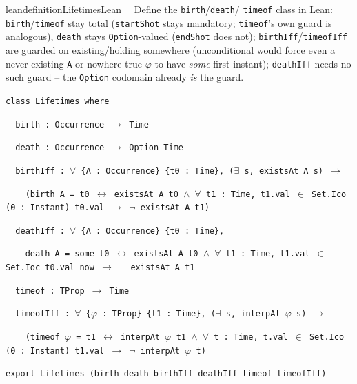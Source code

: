 \begin{restatable}{leandefinition}{LifetimesLean}~~ Define the \texttt{birth}/\texttt{death}/
\texttt{timeof} class in Lean: \texttt{birth}/\texttt{timeof} stay total (\texttt{startShot} stays mandatory;
\texttt{timeof}'s own guard is analogous), \texttt{death} stays \texttt{Option}-valued (\texttt{endShot} does
not); \texttt{birthIff}/\texttt{timeofIff} are guarded on existing/holding somewhere (unconditional would force
even a never-existing \texttt{A} or nowhere-true $\varphi$ to have \emph{some} first instant); \texttt{deathIff}
needs no such guard -- the \texttt{Option} codomain already \emph{is} the guard.

\texttt{\textcolor{leancolor}{class} \textcolor{leanyellow}{Lifetimes} \textcolor{leancolor}{where}}

\texttt{~~birth : Occurrence $\to$ Time}

\texttt{~~death : Occurrence $\to$ Option Time}

\texttt{~~birthIff : $\forall$ \{A : Occurrence\} \{t0 : Time\}, ($\exists$ s, existsAt A s) $\to$}

\texttt{~~~~(birth A = t0 $\leftrightarrow$ existsAt A t0 $\wedge$ $\forall$ t1 : Time, t1.val $\in$ Set.Ico (0 : Instant) t0.val $\to$ $\lnot$ existsAt A t1)}

\texttt{~~deathIff : $\forall$ \{A : Occurrence\} \{t0 : Time\},}

\texttt{~~~~death A = some t0 $\leftrightarrow$ existsAt A t0 $\wedge$ $\forall$ t1 : Time, t1.val $\in$ Set.Ioc t0.val now $\to$ $\lnot$ existsAt A t1}

\texttt{~~timeof : TProp $\to$ Time}

\texttt{~~timeofIff : $\forall$ \{$\varphi$ : TProp\} \{t1 : Time\}, ($\exists$ s, interpAt $\varphi$ s) $\to$}

\texttt{~~~~(timeof $\varphi$ = t1 $\leftrightarrow$ interpAt $\varphi$ t1 $\wedge$ $\forall$ t : Time, t.val $\in$ Set.Ico (0 : Instant) t1.val $\to$ $\lnot$ interpAt $\varphi$ t)}

\texttt{\textcolor{leancolor}{export} Lifetimes (birth death birthIff deathIff timeof timeofIff)}
\label{Lifetimes}
\end{restatable}

